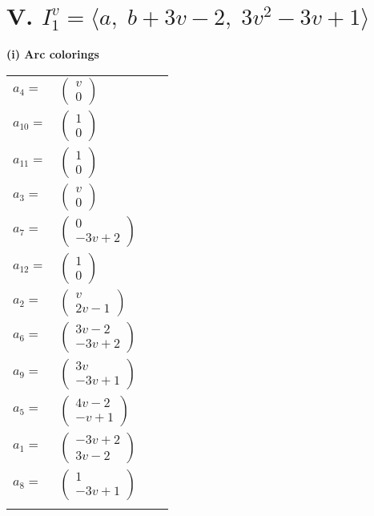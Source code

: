\documentclass[1p]{elsarticle_modified}
\theoremstyle{definition}
\begin{document}
\centering \section*{V. $I^v_{1}= \langle a,\;b+3 v-2,\;3 v^2-3 v+1 \rangle$}
\flushleft \textbf{(i) Arc colorings}\\
\begin{tabular}{m{7pt} m{180pt} m{7pt} m{180pt} }
\flushright $a_{4}=$&$\begin{pmatrix}v\\0\end{pmatrix}$ \\
\flushright $a_{10}=$&$\begin{pmatrix}1\\0\end{pmatrix}$ \\
\flushright $a_{11}=$&$\begin{pmatrix}1\\0\end{pmatrix}$ \\
\flushright $a_{3}=$&$\begin{pmatrix}v\\0\end{pmatrix}$ \\
\flushright $a_{7}=$&$\begin{pmatrix}0\\-3 v+2\end{pmatrix}$ \\
\flushright $a_{12}=$&$\begin{pmatrix}1\\0\end{pmatrix}$ \\
\flushright $a_{2}=$&$\begin{pmatrix}v\\2 v-1\end{pmatrix}$ \\
\flushright $a_{6}=$&$\begin{pmatrix}3 v-2\\-3 v+2\end{pmatrix}$ \\
\flushright $a_{9}=$&$\begin{pmatrix}3 v\\-3 v+1\end{pmatrix}$ \\
\flushright $a_{5}=$&$\begin{pmatrix}4 v-2\\- v+1\end{pmatrix}$ \\
\flushright $a_{1}=$&$\begin{pmatrix}-3 v+2\\3 v-2\end{pmatrix}$ \\
\flushright $a_{8}=$&$\begin{pmatrix}1\\-3 v+1\end{pmatrix}$\\&\end{tabular}
\end{document}
